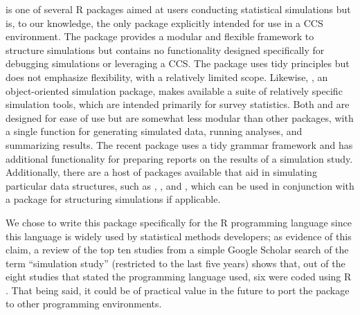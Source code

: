  is one of several R packages aimed at users conducting statistical simulations but is, to our knowledge, the only package explicitly intended for use in a CCS environment. The  package \citep{bien2016simulator} provides a modular and flexible framework to structure simulations but contains no functionality designed specifically for debugging simulations or leveraging a CCS. The  package \citep{brown2023simpr} uses tidy principles but does not emphasize flexibility, with a relatively limited scope. Likewise,  \citep{alfons2010object}, an object-oriented simulation package, makes available a suite of relatively specific simulation tools, which are intended primarily for survey statistics. Both  \citep{chalmers2020writing} and  \citep{hofert2013parallel} are designed for ease of use but are somewhat less modular than other packages, with a single function for generating simulated data, running analyses, and summarizing results. The recent  package \citep{duncan2024simchef} uses a tidy grammar framework and has additional functionality for preparing reports on the results of a simulation study. Additionally, there are a host of packages available that aid in simulating particular data structures, such as  \citep{riskSimul},  \citep{GlmSimulatoR}, and  \citep{PhenotypeSimulator}, which can be used in conjunction with a package for structuring simulations if applicable.

We chose to write this package specifically for the R programming language since this language is widely used by statistical methods developers; as evidence of this claim, a review of the top ten studies from a simple Google Scholar search of the term ``simulation study'' (restricted to the last five years) shows that, out of the eight studies that stated the programming language used, six were coded using R \citep{belias2019statistical,edelsbrunner2023simulation,todorov2020applying,rusticus2019impact,manolov2019simulation,bower2021capturing,hamza2021bayesian,thompson2021comparison}. That being said, it could be of practical value in the future to port the package to other programming environments.

